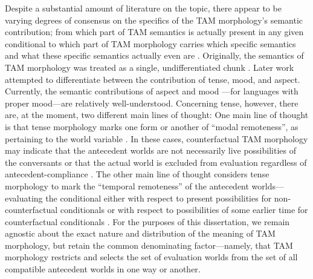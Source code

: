 Despite a substantial amount of literature on the topic, there appear to be varying degrees of consensus on the specifics of the TAM morphology's semantic contribution; from which part of TAM semantics is actually present in any given conditional to which part of TAM morphology carries which specific semantics and what these specific semantics actually even are \parencite{Fintel1997,Fintel2001,Dudman1983,Dudman1984,Iatridou2000,Arregui2007,Anand2010,Schulz2014}. Originally, the semantics of TAM morphology was treated as a single, undifferentiated chunk \parencite{Stalnaker1975,Fintel1997}. Later work attempted to differentiate between the contribution of tense, mood, and aspect. Currently, the semantic contributions of aspect \parencite{Hacquard2006,Arregui2007,Anand2010} and mood \parencite{Romero2017}---for languages with proper mood---are relatively well-understood. Concerning tense, however, there are, at the moment, two different main lines of thought: One main line of thought is that tense morphology marks one form or another of \enquote{modal remoteness}, as pertaining to the world variable \parencite{Stalnaker1975,Palmer1986,Iatridou2000,Huddleston2002,Schulz2014}. In these cases, counterfactual TAM morphology may indicate that the antecedent worlds are not necessarily live possibilities of the conversants \parencite{Stalnaker1975,Fintel1997} or that the actual world is excluded from evaluation regardless of antecedent-compliance \parencite{Iatridou2000,Schulz2014}. The other main line of thought considers tense morphology to mark the \enquote{temporal remoteness} of the antecedent worlds---evaluating the conditional either with respect to present possibilities for non-counterfactual conditionals or with respect to possibilities of some earlier time for counterfactual conditionals \parencite{Dudman1983,Dudman1984,Ippolito2003,Arregui2009,Gronn2009,Romero2014,Romero2017}. For the purposes of this dissertation, we remain agnostic about the exact nature and distribution of the meaning of TAM morphology, but retain the common denominating factor---namely, that TAM morphology restricts and selects the set of evaluation worlds from the set of all compatible antecedent worlds in one way or another.

